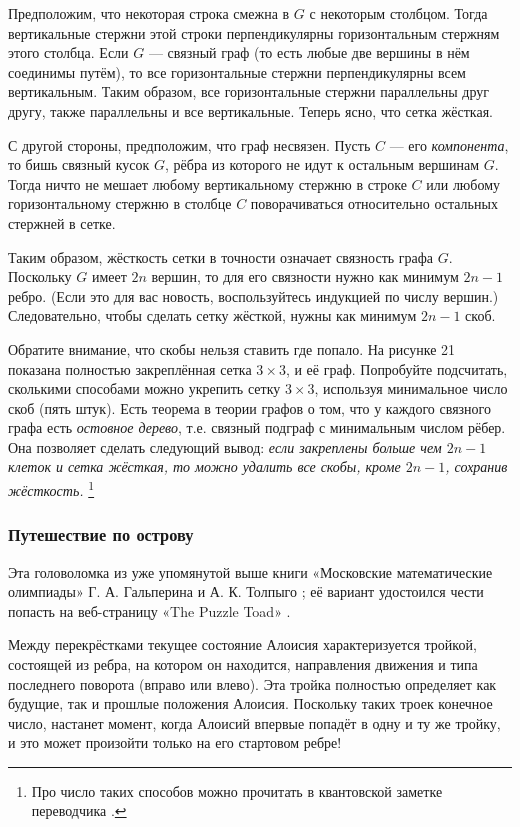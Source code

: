Предположим, что некоторая строка смежна в $G$ с некоторым столбцом.
Тогда вертикальные стержни этой строки перпендикулярны горизонтальным стержням этого столбца.
Если $G$ --- связный граф (то есть любые две вершины в нём соединимы путём), то все горизонтальные стержни перпендикулярны всем вертикальным.
Таким образом, все горизонтальные стержни параллельны друг другу,
также параллельны и все вертикальные.
Теперь ясно, что сетка жёсткая.

С другой стороны, предположим, что граф несвязен.
Пусть $C$ --- его \emph{компонента}, то бишь связный кусок $G$, рёбра из которого не идут к остальным вершинам $G$.
Тогда ничто не мешает любому вертикальному стержню в строке $C$ или любому горизонтальному стержню в столбце $C$ поворачиваться относительно остальных стержней в сетке.

Таким образом, жёсткость сетки в точности означает связность графа $G$.
Поскольку $G$ имеет $2n$ вершин, то для его связности нужно как минимум $2n - 1$ ребро.
(Если это для вас новость, воспользуйтесь индукцией по числу вершин.)
Следовательно, чтобы сделать сетку жёсткой, нужны как минимум $2n - 1$ скоб.

Обратите внимание, что скобы нельзя ставить где попало.
На рисунке 21 показана полностью закреплённая сетка $3 \times 3$, и её граф.
Попробуйте подсчитать, сколькими способами можно укрепить сетку $3 \times 3$, используя минимальное число скоб  (пять штук).
Есть теорема в теории графов о том, что у каждого связного графа есть \emph{остовное дерево}, т.е. связный подграф с минимальным числом рёбер.
Она позволяет сделать следующий вывод: \emph{если закреплены больше чем $2n - 1$ клеток и сетка жёсткая, то можно удалить все скобы, кроме $2n - 1$, сохранив жёсткость.}%
\footnote{Про число таких способов можно прочитать в квантовской заметке переводчика \cite{petrunin-2018}. \pr}

\subsubsection*{Путешествие по острову}

Эта головоломка из уже упомянутой выше книги «Московские математические олимпиады» Г. А. Гальперина и А. К. Толпыго \cite{23}; её вариант удостоился чести попасть на веб-страницу «The Puzzle Toad» \cite{bohman-pikhurko-frieze-sleator}.

Между перекрёстками текущее состояние Алоисия характеризуется тройкой, состоящей из ребра, на котором он находится, направления движения и типа последнего поворота (вправо или влево).
Эта тройка полностью определяет как будущие, так и прошлые положения Алоисия.
Поскольку таких троек конечное число, настанет момент, когда Алоисий впервые попадёт в одну и ту же тройку, и это может произойти только на его стартовом ребре!


